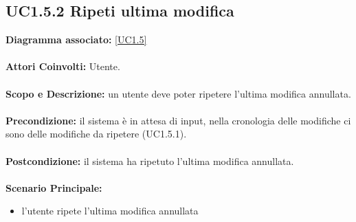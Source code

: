 \subsection{UC1.5.2 Ripeti ultima modifica}
\textbf{Diagramma associato:}
\ref{UC1.5} \\ \\
\textbf{Attori Coinvolti:}
Utente. \\ \\
\textbf{Scopo e Descrizione:}
un utente deve poter ripetere l'ultima modifica annullata. \\ \\
\textbf{Precondizione:}
il sistema è in attesa di input, nella cronologia delle modifiche ci sono delle modifiche da ripetere (UC1.5.1). \\ \\
\textbf{Postcondizione:}
il sistema ha ripetuto l'ultima modifica annullata. \\ \\
\textbf{Scenario Principale:}
\begin{itemize}
\item l'utente ripete l'ultima modifica annullata
\\ \\ \end{itemize}


